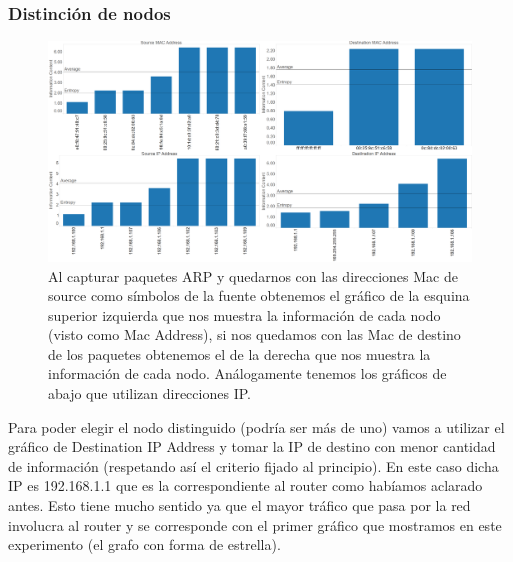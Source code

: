 \documentclass{article}
\theoremstyle{definition}
\theoremstyle{remark}
\begin{document}
\subsubsection{Distinción de nodos}
\begin{figure}[H]
    \centering
    \includegraphics[width=1\textwidth]{../captures/CasaGerman/PDFs Dashboard.png}
    \caption{Al capturar paquetes ARP y quedarnos con las direcciones Mac de source como símbolos de la fuente obtenemos el gráfico de la esquina superior izquierda que nos muestra la información de cada nodo (visto como Mac Address), si nos quedamos con las Mac de destino de los paquetes obtenemos el de la derecha que nos muestra la información de cada nodo. Análogamente tenemos los gráficos de abajo que utilizan direcciones IP.}
    \label{fig:mesh1}
\end{figure}

Para poder elegir el nodo distinguido (podría ser más de uno) vamos a utilizar el gráfico de Destination IP Address y tomar la IP de destino con menor cantidad de información (respetando así el criterio fijado al principio). En este caso dicha IP es 192.168.1.1 que es la correspondiente al router como habíamos aclarado antes. Esto tiene mucho sentido ya que el mayor tráfico que pasa por la red involucra al router y se corresponde con el primer gráfico que mostramos en este experimento (el grafo con forma de estrella).
\end{document}
